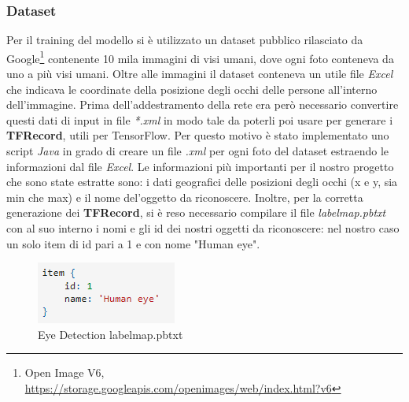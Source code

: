 \documentclass[11pt]{article}
\begin{document}
\subsubsection{Dataset}
\label{ssu:daa}
Per il training del modello si è utilizzato un dataset pubblico rilasciato da Google\footnote{Open Image V6, \url{https://storage.googleapis.com/openimages/web/index.html?v6}} contenente 10 mila immagini di visi umani, dove ogni foto conteneva da uno a più visi umani.
\newline
Oltre alle immagini il dataset conteneva un utile file \textit{Excel} che indicava le coordinate della posizione degli occhi delle persone all'interno dell'immagine.
\newline \newline
Prima dell'addestramento della rete era però necessario convertire questi dati di input in file \textit{*.xml} in modo tale da poterli poi usare per generare i \textbf{TFRecord}, utili per TensorFlow. Per questo motivo è stato implementato uno script \textit{Java} in grado di creare un file \textit{.xml} per ogni foto del dataset estraendo le informazioni dal file \textit{Excel}. Le informazioni più importanti per il nostro progetto che sono state estratte sono: i dati geografici delle posizioni degli occhi (x e y, sia min che max) e il nome del'oggetto da riconoscere. 
Inoltre, per la corretta generazione dei \textbf{TFRecord}, si è reso necessario compilare il file \textit{labelmap.pbtxt} con al suo interno i nomi e gli id dei nostri oggetti da riconoscere: nel nostro caso un solo item di id pari a 1 e con nome "Human eye".

\begin{figure}[h]
\caption{Eye Detection labelmap.pbtxt}
\centering
\includegraphics[scale=1]{img/item.png}
\end{figure}
\end{document}
